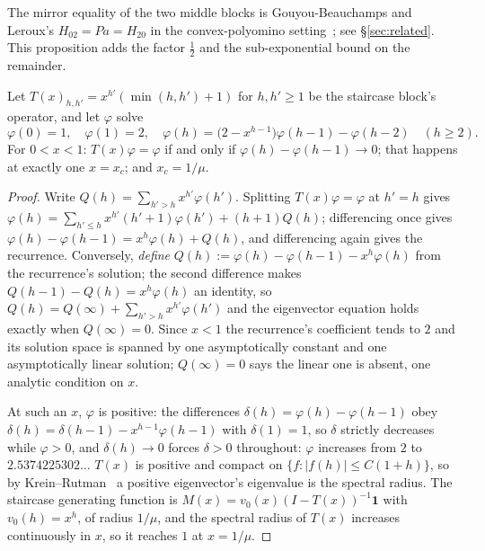 \documentclass[11pt]{article}
\begin{document}
\begin{remark}[attribution --- 2 of 3]
\label{rem:attr2}
The mirror equality of the two middle blocks is Gouyou-Beauchamps and Leroux's
$H_{02} = Pa = H_{20}$ in the convex-polyomino setting~\cite{gblRoux2004}; see
\S\ref{sec:related}. This proposition adds the factor
$\tfrac12$ and the sub-exponential bound on the remainder.
\end{remark}

\begin{proposition}
\label{prop:phi}
Let $T(x)_{h,h'} = x^{h'}(\min(h,h')+1)$ for $h,h' \ge 1$ be the staircase
block's operator, and let $\varphi$ solve
\[
  \varphi(0) = 1, \quad \varphi(1) = 2, \quad
  \varphi(h) = \bigl(2 - x^{h-1}\bigr)\varphi(h{-}1) - \varphi(h{-}2)
  \quad (h \ge 2).
\]
For $0 < x < 1$: $T(x)\varphi = \varphi$ if and only if
$\varphi(h) - \varphi(h{-}1) \to 0$; that happens at exactly one $x = x_c$; and
$x_c = 1/\mu$.
\end{proposition}

\begin{proof}
Write $Q(h) = \sum_{h'>h}x^{h'}\varphi(h')$. Splitting $T(x)\varphi = \varphi$
at $h' = h$ gives $\varphi(h) = \sum_{h'\le h}x^{h'}(h'{+}1)\varphi(h') +
(h{+}1)Q(h)$; differencing once gives
$\varphi(h)-\varphi(h{-}1) = x^h\varphi(h) + Q(h)$, and differencing again gives
the recurrence. Conversely, \emph{define}
$Q(h) := \varphi(h)-\varphi(h{-}1)-x^h\varphi(h)$ from the recurrence's
solution; the second difference makes $Q(h{-}1)-Q(h) = x^h\varphi(h)$ an
identity, so $Q(h) = Q(\infty) + \sum_{h'>h}x^{h'}\varphi(h')$ and the
eigenvector equation holds exactly when $Q(\infty) = 0$. Since $x < 1$ the
recurrence's coefficient tends to $2$ and its solution space is spanned by one
asymptotically constant and one asymptotically linear solution; $Q(\infty) = 0$
says the linear one is absent, one analytic condition on $x$.

At such an $x$, $\varphi$ is positive: the differences
$\delta(h) = \varphi(h)-\varphi(h{-}1)$ obey
$\delta(h) = \delta(h{-}1) - x^{h-1}\varphi(h{-}1)$ with $\delta(1) = 1$, so
$\delta$ strictly decreases while $\varphi > 0$, and $\delta(h) \to 0$ forces
$\delta > 0$ throughout: $\varphi$ increases from $2$ to $2.5374225302\dots$
$T(x)$ is positive and compact on $\{f : |f(h)| \le C(1+h)\}$, so by
Krein--Rutman~\cite{kreinRutman1948} a positive eigenvector's eigenvalue is the
spectral radius. The staircase generating function is
$M(x) = v_0(x)(I-T(x))^{-1}\mathbf 1$ with $v_0(h) = x^h$, of radius $1/\mu$,
and the spectral radius of $T(x)$ increases continuously in $x$, so it reaches
$1$ at $x = 1/\mu$.
\end{proof}
\end{document}
